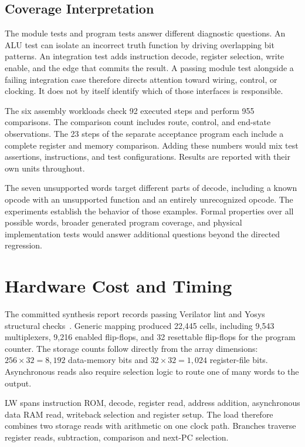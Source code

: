 \documentclass[conference,letterpaper]{IEEEtran}
\begin{document}
\subsection{Coverage Interpretation}
The module tests and program tests answer different diagnostic questions. An ALU test can isolate an incorrect truth function by driving overlapping bit patterns. An integration test adds instruction decode, register selection, write enable, and the edge that commits the result. A passing module test alongside a failing integration case therefore directs attention toward wiring, control, or clocking. It does not by itself identify which of those interfaces is responsible.

The six assembly workloads check 92 executed steps and perform 955 comparisons. The comparison count includes route, control, and end-state observations. The 23 steps of the separate acceptance program each include a complete register and memory comparison. Adding these numbers would mix test assertions, instructions, and test configurations. Results are reported with their own units throughout.

The seven unsupported words target different parts of decode, including a known opcode with an unsupported function and an entirely unrecognized opcode. The experiments establish the behavior of those examples. Formal properties over all possible words, broader generated program coverage, and physical implementation tests would answer additional questions beyond the directed regression.

\section{Hardware Cost and Timing}

The committed synthesis report records passing Verilator lint and Yosys structural checks~\cite{project,yosys}. Generic mapping produced 22,445 cells, including 9,543 multiplexers, 9,216 enabled flip-flops, and 32 resettable flip-flops for the program counter. The storage counts follow directly from the array dimensions: $256\times32=8{,}192$ data-memory bits and $32\times32=1{,}024$ register-file bits. Asynchronous reads also require selection logic to route one of many words to the output.

LW spans instruction ROM, decode, register read, address addition, asynchronous data RAM read, writeback selection and register setup. The load therefore combines two storage reads with arithmetic on one clock path. Branches traverse register reads, subtraction, comparison and next-PC selection.
\end{document}
